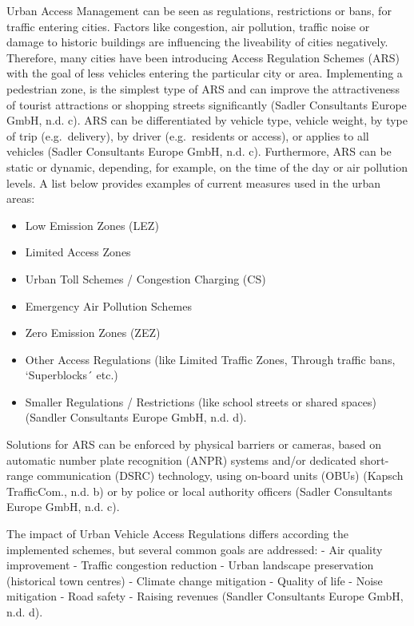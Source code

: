 \documentclass[
]{book}
\providecommand{\tightlist}{%
  \setlength{\itemsep}{0pt}\setlength{\parskip}{0pt}}
\begin{document}
Urban Access Management can be seen as regulations, restrictions or bans, for traffic entering cities. Factors like congestion, air pollution, traffic noise or damage to historic buildings are influencing the liveability of cities negatively. Therefore, many cities have been introducing Access Regulation Schemes (ARS) with the goal of less vehicles entering the particular city or area. Implementing a pedestrian zone, is the simplest type of ARS and can improve the attractiveness of tourist attractions or shopping streets significantly (Sadler Consultants Europe GmbH, n.d. c). ARS can be differentiated by vehicle type, vehicle weight, by type of trip (e.g.~delivery), by driver (e.g.~residents or access), or applies to all vehicles (Sadler Consultants Europe GmbH, n.d. c). Furthermore, ARS can be static or dynamic, depending, for example, on the time of the day or air pollution levels. A list below provides examples of current measures used in the urban areas:

\begin{itemize}
\tightlist
\item
  Low Emission Zones (LEZ)
\item
  Limited Access Zones
\item
  Urban Toll Schemes / Congestion Charging (CS)
\item
  Emergency Air Pollution Schemes
\item
  Zero Emission Zones (ZEZ)
\item
  Other Access Regulations (like Limited Traffic Zones, Through traffic bans, `Superblocks´ etc.)
\item
  Smaller Regulations / Restrictions (like school streets or shared spaces) (Sandler Consultants Europe GmbH, n.d. d).
\end{itemize}

Solutions for ARS can be enforced by physical barriers or cameras, based on automatic number plate recognition (ANPR) systems and/or dedicated short-range communication (DSRC) technology, using on-board units (OBUs) (Kapsch TrafficCom., n.d. b) or by police or local authority officers (Sadler Consultants Europe GmbH, n.d. c).

The impact of Urban Vehicle Access Regulations differs according the implemented schemes, but several common goals are addressed:
- Air quality improvement
- Traffic congestion reduction
- Urban landscape preservation (historical town centres)
- Climate change mitigation
- Quality of life
- Noise mitigation
- Road safety
- Raising revenues (Sandler Consultants Europe GmbH, n.d. d).
\end{document}
